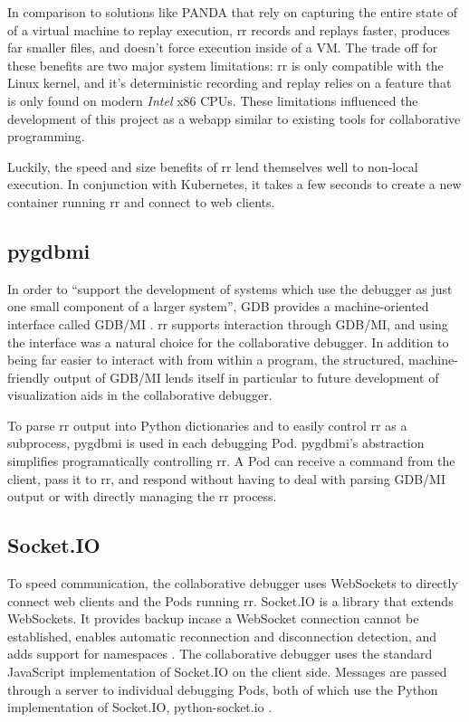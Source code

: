 \documentclass[12pt]{article}
\begin{document}
In comparison to solutions like PANDA\cite{10.1145/2843859.2843867}
that rely on capturing the entire state of of a virtual machine to
replay execution, rr records and replays faster, produces far smaller
files, and doesn't force execution inside of a
VM.\cite{DBLP:journals/corr/OCallahanJFHNP17} The trade off for these
benefits are two major system limitations: rr is only compatible with
the Linux kernel, and it's deterministic recording and replay relies
on a feature that is only found on modern \textit{Intel} x86 CPUs.
These limitations influenced the development of this project as a
webapp similar to existing tools for collaborative programming.
\par

Luckily, the speed and size benefits of rr lend themselves well to
non-local execution.  In conjunction with Kubernetes, it takes a few
seconds to create a new container running rr and connect to web
clients.

\subsection{pygdbmi}

In order to ``support the development of systems which use the
debugger as just one small component of a larger system'', GDB
provides a machine-oriented interface called GDB/MI \cite{gdbman}. rr
supports interaction through GDB/MI, and using the interface was a
natural choice for the collaborative debugger.  In addition to being
far easier to interact with from within a program, the structured,
machine-friendly output of GDB/MI lends itself in particular to future
development of visualization aids in the collaborative debugger.
\par
To parse rr output into Python dictionaries and to easily control rr
as a subprocess, pygdbmi \cite{pygdbmi} is used in each debugging Pod.
pygdbmi's abstraction simplifies programatically controlling rr.  A
Pod can receive a command from the client, pass it to rr, and respond
without having to deal with parsing GDB/MI output or with directly
managing the rr process.

\subsection{Socket.IO}\label{socketio}

To speed communication, the collaborative debugger uses WebSockets to
directly connect web clients and the Pods running rr.  Socket.IO is a
library that extends WebSockets.  It provides backup incase a
WebSocket connection cannot be established, enables automatic
reconnection and disconnection detection, and adds support for
namespaces \cite{socketio}.  The collaborative debugger uses the
standard JavaScript implementation of Socket.IO on the client side.
Messages are passed through a server to individual debugging Pods,
both of which use the Python implementation of Socket.IO,
python-socket.io \cite{python_socketio}.
\end{document}
